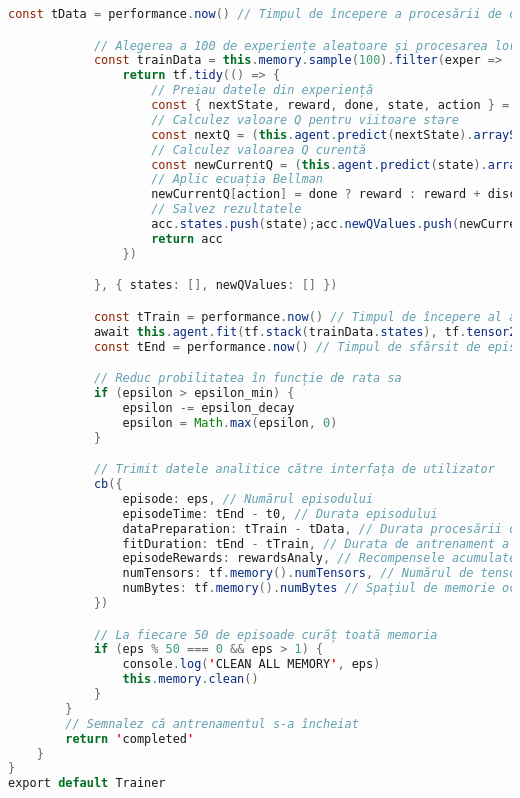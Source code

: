 \begin{lstlisting}[language=Java, caption={Structura clasei Trainer}]
            const tData = performance.now() // Timpul de începere a procesării de date

            // Alegerea a 100 de experiențe aleatoare și procesarea lor
            const trainData = this.memory.sample(100).filter(exper => !exper.state.isDisposed && !exper.nextState.isDisposed).reduce((acc, exper) => {
                return tf.tidy(() => {
                    // Preiau datele din experiență
                    const { nextState, reward, done, state, action } = exper
                    // Calculez valoare Q pentru viitoare stare
                    const nextQ = (this.agent.predict(nextState).arraySync())[0]
                    // Calculez valoarea Q curentă
                    const newCurrentQ = (this.agent.predict(state).arraySync())[0]
                    // Aplic ecuația Bellman
                    newCurrentQ[action] = done ? reward : reward + discount * Math.max(...nextQ)
                    // Salvez rezultatele
                    acc.states.push(state);acc.newQValues.push(newCurrentQ)
                    return acc
                })

            }, { states: [], newQValues: [] })

            const tTrain = performance.now() // Timpul de începere al antrenării rețelei neuronale
            await this.agent.fit(tf.stack(trainData.states), tf.tensor2d(trainData.newQValues))
            const tEnd = performance.now() // Timpul de sfărsit de episod

            // Reduc probilitatea în funcție de rata sa 
            if (epsilon > epsilon_min) {
                epsilon -= epsilon_decay
                epsilon = Math.max(epsilon, 0)
            }

            // Trimit datele analitice către interfața de utilizator 
            cb({
                episode: eps, // Numărul episodului
                episodeTime: tEnd - t0, // Durata episodului
                dataPreparation: tTrain - tData, // Durata procesării de date
                fitDuration: tEnd - tTrain, // Durata de antrenament a    rețelei
                episodeRewards: rewardsAnaly, // Recompensele acumulate
                numTensors: tf.memory().numTensors, // Numărul de tensori
                numBytes: tf.memory().numBytes // Spațiul de memorie ocupat
            })

            // La fiecare 50 de episoade curăț toată memoria
            if (eps % 50 === 0 && eps > 1) {
                console.log('CLEAN ALL MEMORY', eps)
                this.memory.clean()
            }
        }
        // Semnalez că antrenamentul s-a încheiat
        return 'completed'
    }
}
export default Trainer
\end{lstlisting}

